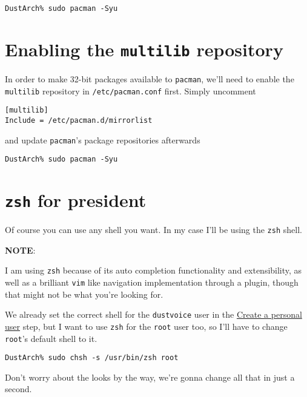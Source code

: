 \documentclass[9pt]{report}
\newcommand{\admonition}[2]{\textbf{#1}: {#2}}
\begin{document}
\begin{verbatim}
DustArch% sudo pacman -Syu
\end{verbatim}


\vfill\eject

\hypertarget{x-enabling-the-multilib-repository}{\section{Enabling the \texttt{multilib} repository}}
In order to make 32-bit packages available to \texttt{pacman}, we’ll need to enable the \texttt{multilib} repository in \texttt{/etc/pacman.conf} first.
Simply uncomment


\begin{verbatim}
[multilib]
Include = /etc/pacman.d/mirrorlist
\end{verbatim}

and update \texttt{pacman}'s package repositories afterwards


\begin{verbatim}
DustArch% sudo pacman -Syu
\end{verbatim}


\vfill\eject

\hypertarget{x-zsh-for-president}{\section{\texttt{zsh} for president}}
Of course you can use any shell you want.
In my case I’ll be using the \texttt{zsh} shell.


\admonition{NOTE}{I am using \texttt{zsh} because of its auto completion functionality and extensibility, as well as a brilliant \texttt{vim} like navigation implementation through a plugin, though that might not be what you’re looking for.

}
We already set the correct shell for the \texttt{dustvoice} user in the \hyperlink{create-a-personal-user}{Create a personal user} step, but I want to use \texttt{zsh} for the \texttt{root} user too, so I’ll have to change \texttt{root}'s default shell to it.


\begin{verbatim}
DustArch% sudo chsh -s /usr/bin/zsh root
\end{verbatim}

Don’t worry about the looks by the way, we’re gonna change all that in just a second.



\vfill\eject
\end{document}
